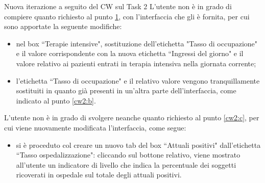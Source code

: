 \begin{bclogo}{Nuova iterazione a seguito del CW sul Task 2}
    L'utente non è in grado di compiere quanto richiesto al punto \hyperref[cw2:a]{1}, con l'interfaccia che gli è fornita, per cui sono apportate la seguente modifiche:
    \begin{itemize}
        \item nel box ``Terapie intensive", sostituzione dell'etichetta "Tasso di occupazione" e il valore corrispondente con la nuova etichetta ``Ingressi del giorno" e il valore relativo ai pazienti entrati in terapia intensiva nella giornata corrente;
        \item l'etichetta ``Tasso di occupazione" e il relativo valore vengono tranquillamente sostituiti in quanto già presenti in un'altra parte dell'interfaccia, come indicato al punto \ref{cw2:b}.
    \end{itemize}
   L'utente non è in grado di svolgere neanche quanto richiesto  al punto \ref{cw2:c}, per cui viene nuovamente modificata l'interfaccia, come segue:
    \begin{itemize}
        \item si è proceduto col creare un nuovo tab del box ``Attuali positivi" dall'etichetta ``Tasso ospedalizzazione": cliccando sul bottone relativo, viene mostrato all'utente un indicatore di livello che indica la percentuale dei soggetti ricoverati in ospedale sul totale degli attuali positivi.
    \end{itemize}
\end{bclogo}